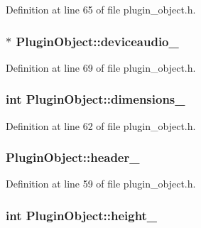 Definition at line 65 of file plugin\_\-object.h.

\hypertarget{class_plugin_object_aec43fcb4f77ce50598bb1851b100d045}{
\subsubsection[{deviceaudio\_\-}]{$\ast$ {\bf PluginObject::deviceaudio\_\-}}}
\label{class_plugin_object_aec43fcb4f77ce50598bb1851b100d045}


Definition at line 69 of file plugin\_\-object.h.

\hypertarget{class_plugin_object_a60f6c920af50735f647d1715d7a27384}{
\subsubsection[{dimensions\_\-}]{\setlength{\rightskip}{0pt plus 5cm}int {\bf PluginObject::dimensions\_\-}}}
\label{class_plugin_object_a60f6c920af50735f647d1715d7a27384}


Definition at line 62 of file plugin\_\-object.h.

\hypertarget{class_plugin_object_a2d49cd1ca32c2522400d2505bd3e357e}{
\subsubsection[{header\_\-}]{ {\bf PluginObject::header\_\-}}}
\label{class_plugin_object_a2d49cd1ca32c2522400d2505bd3e357e}


Definition at line 59 of file plugin\_\-object.h.

\hypertarget{class_plugin_object_af5872be14fbb29cf6cdf6df495766dd1}{
\subsubsection[{height\_\-}]{\setlength{\rightskip}{0pt plus 5cm}int {\bf PluginObject::height\_\-}}}
\label{class_plugin_object_af5872be14fbb29cf6cdf6df495766dd1}


